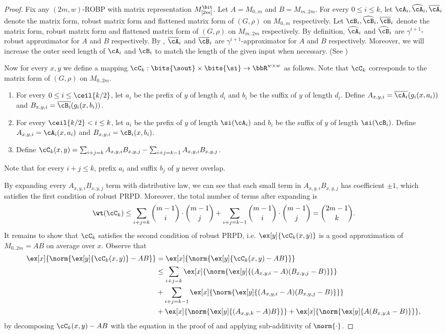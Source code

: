 \begin{proof}
Fix any $(2m,w)$-ROBP with matrix representation $M_{[2m]}^{\bit}$. Let $A=M_{0..m}$ and $B=M_{m..2m}$.
 For every $0\le i\le k$, let $\cA_i,\widehat{\cA}_i,\overline{\cA}_i$ denote the matrix form, robust matrix form and flattened matrix form of $(G,\rho)$ on $M_{0..m}$ respectively. Let $\cB_i,\widehat{\cB}_i,\overline{\cB}_i$ denote the matrix form, robust matrix form and flattened matrix form of $(G,\rho)$ on $M_{m..2m}$ respectively. By definition, $\widehat{\cA}_i$ and $\widehat{\cB}_i$ are $\gamma^{i+1}$-robust approximator for $A$ and $B$ respectively. By , $\overline{\cA}_i$ and $\overline{\cB}_i$ are $\gamma^{i+1}$-approximator for $A$ and $B$ respectively. Moreover, we will increase the outer seed length of $\cA_i$ and $\cB_i$ to match the length of the given input when necessary. (See )
 
Now for every $x,y$ we define a mapping $\cC_k:\bits{\sout}\times\bits{\si}\to\bbR^{w\times w}$ as follows. Note that $\cC_k$ corresponds to the matrix form of $(G,\rho)$ on $M_{0..2m}$.
\begin{enumerate}[(1)]
\item
For every $0\le i\le \ceil{k/2}$, let $a_i$ be the prefix of $y$ of length $d_i$ and $b_i$ be the suffix of $y$ of length $d_i$. Define $A_{x,y,i}=\overline{\cA_i}(g_i(x,a_i))$ and $B_{x,y,i}=\overline{\cB_i}(g_i(x,b_i))$.
\item
For every $\ceil{k/2}<i\le k$, let $a_i$ be the prefix of $y$ of length $\si(\cA_i)$ and $b_i$ be the suffix of $y$ of length $\si(\cB_i)$. Define $A_{x,y,i}=\cA_i(x,a_i)$ and $B_{x,y,i}=\cB_i(x,b_i)$.
\item
Define $\cC_k(x,y)=\sum_{i+j=k} A_{x,y,i}B_{x,y,j}-\sum_{i+j=k-1}A_{x,y,i}B_{x,y,j}$.
\end{enumerate}
Note that for every $i+j\le k$, prefix $a_i$ and suffix $b_j$ of $y$ never overlap.

By expanding every $A_{x,y,i}B_{x,y,j}$ term with distributive law, we can see that each small term in $A_{x,y,i}B_{x,y,j}$ has coefficient $\pm 1$, which satisfies the first condition of robust PRPD. Moreover, the total number of terms after expanding is 
$$\wt(\cC_k)\le \sum_{i+j=k}\binom{m-1}{i}\cdot \binom{m-1}{j} + \sum_{i+j=k-1}\binom{m-1}{i}\cdot \binom{m-1}{j}= \binom{2m-1}{k}.$$
It remains to show that $\cC_k$ satisfies the second condition of robust PRPD, i.e. $\ex[y]{\cC_k(x,y)}$ is a good approximation of $M_{0..2m}=AB$ on average over $x$. Observe that 
\begin{align*}
\ex[x]{\norm{\ex[y]{\cC_k(x,y)}-AB}}
&=\ex[x]{\norm{\ex[y]{\cC_k(x,y)-AB}}}\\
&\le \sum_{i+j=k} \ex[x]{\norm{\ex[y]{(A_{x,y,i}-A)(B_{x,y,j}-B)}}} \\
&+ \sum_{i+j=k-1} \ex[x]{\norm{\ex[y]{(A_{x,y,i}-A)(B_{x,y,j}-B)}}}\\
&+ \ex[x]{\norm{\ex[y]{(A_{x,y,k}-A)B}}} + \ex[x]{\norm{\ex[y]{A(B_{x,y,k}-B)}}},
\end{align*}
by decomposing $\cC_k(x,y)-AB$ with the equation in the proof of  and applying sub-additivity of $\norm{\cdot}$. 


\end{proof}
